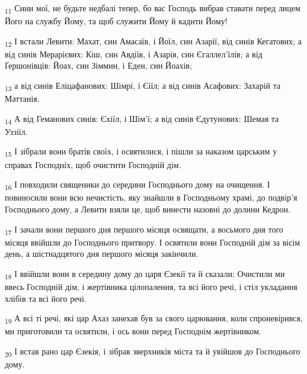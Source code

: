 \begin{tcolorbox}
\textsubscript{11} Сини мої, не будьте недбалі тепер, бо вас Господь вибрав ставати перед лицем Його на службу Йому, та щоб служити Йому й кадити Йому!
\end{tcolorbox}
\begin{tcolorbox}
\textsubscript{12} І встали Левити: Махат, син Амасаїв, і Йоїл, син Азарії, від синів Кегатових; а від синів Мерарієвих: Кіш, син Авдіїв, і Азарія, син Єгаллел'їлів; а від Ґершонівців: Йоах, син Зіммин, і Еден, син Йоахів;
\end{tcolorbox}
\begin{tcolorbox}
\textsubscript{13} а від синів Еліцафанових: Шімрі, і Єіїл; а від синів Асафових: Захарій та Маттанія.
\end{tcolorbox}
\begin{tcolorbox}
\textsubscript{14} А від Геманових синів: Єхіїл, і Шім'ї; а від синів Єдутунових: Шемая та Уззіїл.
\end{tcolorbox}
\begin{tcolorbox}
\textsubscript{15} І зібрали вони братів своїх, і освятилися, і пішли за наказом царським у справах Господніх, щоб очистити Господній дім.
\end{tcolorbox}
\begin{tcolorbox}
\textsubscript{16} І повходили священики до середини Господнього дому на очищення. І повиносили вони всю нечистість, яку знайшли в Господньому храмі, до подвір'я Господнього дому, а Левити взяли це, щоб винести назовні до долини Кедрон.
\end{tcolorbox}
\begin{tcolorbox}
\textsubscript{17} І зачали вони першого дня першого місяця освящати, а восьмого дня того місяця ввійшли до Господнього притвору. І освятили вони Господній дім за вісім день, а шістнадцятого дня першого місяця закінчили.
\end{tcolorbox}
\begin{tcolorbox}
\textsubscript{18} І ввійшли вони в середину дому до царя Єзекії та й сказали: Очистили ми ввесь Господній дім, і жертівника цілопалення, та всі його речі, і стіл укладання хлібів та всі його речі.
\end{tcolorbox}
\begin{tcolorbox}
\textsubscript{19} А всі ті речі, які цар Ахаз занехав був за свого царювання, коли спроневірився, ми приготовили та освятили, і ось вони перед Господнім жертівником.
\end{tcolorbox}
\begin{tcolorbox}
\textsubscript{20} І встав рано цар Єзекія, і зібрав зверхників міста та й увійшов до Господнього дому.
\end{tcolorbox}
